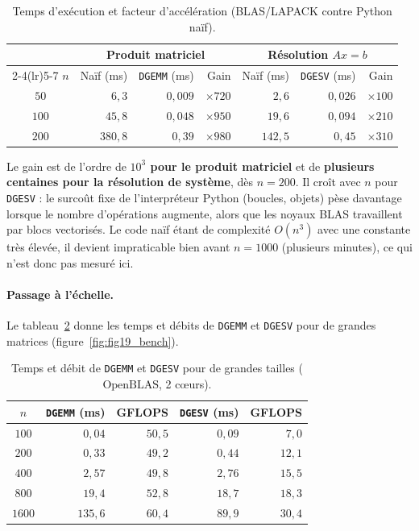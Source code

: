 \documentclass[11pt,a4paper]{report}
\theoremstyle{plain}
\theoremstyle{definition}
\theoremstyle{remark}
\begin{document}
\begin{table}[ht]
\centering
\caption{Temps d'exécution et facteur d'accélération (BLAS/LAPACK contre Python naïf).}
\label{tab:bench_speedup}
\begin{tabular}{c r r r r r r}
\toprule
 & \multicolumn{3}{c}{\textbf{Produit matriciel}} & \multicolumn{3}{c}{\textbf{Résolution $Ax=b$}} \\
\cmidrule(lr){2-4}\cmidrule(lr){5-7}
$n$ & Naïf (ms) & \texttt{DGEMM} (ms) & Gain & Naïf (ms) & \texttt{DGESV} (ms) & Gain \\
\midrule
$50$ & $6{,}3$ & $0{,}009$ & $\times 720$ & $2{,}6$ & $0{,}026$ & $\times100$ \\
$100$ & $45{,}8$ & $0{,}048$ & $\times 950$ & $19{,}6$ & $0{,}094$ & $\times210$ \\
$200$ & $380{,}8$ & $0{,}39$ & $\times 980$ & $142{,}5$ & $0{,}45$ & $\times310$ \\
\bottomrule
\end{tabular}
\end{table}

Le gain est de l'ordre de \textbf{$10^3$ pour le produit matriciel} et de \textbf{plusieurs centaines pour la résolution de système}, dès $n=200$. Il croît avec $n$ pour \texttt{DGESV} : le surcoût fixe de l'interpréteur Python (boucles, objets) pèse davantage lorsque le nombre d'opérations augmente, alors que les noyaux BLAS travaillent par blocs vectorisés. Le code naïf étant de complexité $O(n^3)$ avec une constante très élevée, il devient impraticable bien avant $n=1000$ (plusieurs minutes), ce qui n'est donc pas mesuré ici.

\paragraph{Passage à l'échelle.} Le tableau~\ref{tab:bench_gflops} donne les temps et débits de \texttt{DGEMM} et \texttt{DGESV} pour de grandes matrices (figure~\ref{fig:fig19_bench}).

\begin{table}[ht]
\centering
\caption{Temps et débit de \texttt{DGEMM} et \texttt{DGESV} pour de grandes tailles ($\text{OpenBLAS}$, 2 cœurs).}
\label{tab:bench_gflops}
\begin{tabular}{c r r r r}
\toprule
$n$ & \texttt{DGEMM} (ms) & GFLOPS & \texttt{DGESV} (ms) & GFLOPS \\
\midrule
$100$ & $0{,}04$ & $50{,}5$ & $0{,}09$ & $7{,}0$ \\
$200$ & $0{,}33$ & $49{,}2$ & $0{,}44$ & $12{,}1$ \\
$400$ & $2{,}57$ & $49{,}8$ & $2{,}76$ & $15{,}5$ \\
$800$ & $19{,}4$ & $52{,}8$ & $18{,}7$ & $18{,}3$ \\
$1600$ & $135{,}6$ & $60{,}4$ & $89{,}9$ & $30{,}4$ \\
\bottomrule
\end{tabular}
\end{table}
\end{document}
